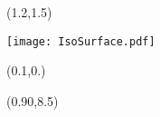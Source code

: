 \documentclass{beamer}
\begin{document}
 
\begin{frame}[plain,t]{}
%		
%   
	\centering
	\begin{textblock}{10}(1.2,1.5)
			\begin{minipage}{\textwidth}
			\texttt{[image: IsoSurface.pdf]}
			\end{minipage}
	\end{textblock}%
	
	\begin{textblock}{4.9}(0.1,0.)
	\end{textblock}%
    \begin{textblock}{10}(0.90,8.5)
	\end{textblock}%
	

\end{frame}
	
\end{document}
